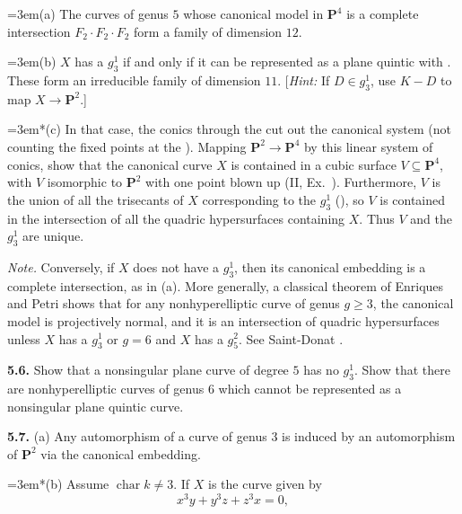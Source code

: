 {\noindent\hangindent=3em\hspace*{1.7em}(a) The curves of genus $5$ whose canonical model in $\mathbf P^4$ is a complete intersection $F_2\cdot F_2\cdot F_2$ form a family of dimension $12$.

\noindent\hangindent=3em\hspace*{1.7em}(b) $X$ has a $g_3^1$ if and only if it can be represented as a plane quintic with . These form an irreducible family of dimension $11$. [\emph{Hint:} If $D\in g_3^1$, use $K-D$ to map $X\to\mathbf P^2$.]

\noindent\hangindent=3em\hspace*{1.4em}*(c) In that case, the conics through the  cut out the canonical system (not counting the fixed points at the ). Mapping $\mathbf P^2\to\mathbf P^4$ by this linear system of conics, show that the canonical curve $X$ is contained in a cubic surface $V\subseteq\mathbf P^4$, with $V$ isomorphic to $\mathbf P^2$ with one point blown up (II, Ex.~). Furthermore, $V$ is the union of all the trisecants of $X$ corresponding to the $g_3^1$ (), so $V$ is contained in the intersection of all the quadric hypersurfaces containing $X$. Thus $V$ and the $g_3^1$ are unique.

\emph{Note.} Conversely, if $X$ does not have a $g_3^1$, then its canonical embedding is a complete intersection, as in (a). More generally, a classical theorem of Enriques and Petri shows that for any nonhyperelliptic curve of genus $g\ge3$, the canonical model is projectively normal, and it is an intersection of quadric hypersurfaces unless $X$ has a $g_3^1$ or $g=6$ and $X$ has a $g_5^2$. See Saint-Donat .

\smallskip
\noindent\hypertarget{ex-IV-5.6}{}\textbf{5.6.} Show that a nonsingular plane curve of degree $5$ has no $g_3^1$. Show that there are nonhyperelliptic curves of genus $6$ which cannot be represented as a nonsingular plane quintic curve.

\smallskip
\noindent\hypertarget{ex-IV-5.7}{}\textbf{5.7.} (a) Any automorphism of a \EditionText{}curve of genus $3$ is induced by an automorphism of $\mathbf P^2$ via the canonical embedding.

\noindent\hangindent=3em\hspace*{1.4em}*(b) Assume $\operatorname{char}k\ne3$\EditionText{}. If $X$ is the curve given by
\[
x^3y+y^3z+z^3x=0,
\]}
